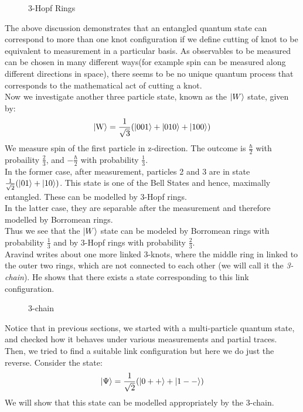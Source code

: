 \documentclass{scrartcl}
\begin{document}
\begin{figure}[H]
    \centering
   \scalebox{0.8}{ }
   \caption{3-Hopf Rings}
\end{figure}
\noindent
The above discussion demonstrates that an entangled quantum state can correspond to more than one knot configuration if we define cutting of knot to be equivalent to measurement in a particular basis. As observables to be measured can be chosen in many different ways(for example spin can be measured along different directions in space), there seems to be no unique quantum process that corresponds to the mathematical act of cutting a knot. \\[0.3cm]
Now we investigate another three particle state, known as the $\ket{W}$ state, given by:
\[
\ket{\mathrm{W}} = \frac{1}{\sqrt{3}} (\ket{001}+\ket{010}+\ket{100}) 
\]
We measure spin of the first particle in z-direction. The outcome is $\frac{\hbar}{2}$ with probaility $\frac{2}{3}$, and $-\frac{\hbar}{2}$ with probability $\frac{1}{3}$.\\[0.2cm]
In the former case, after measurement, particles 2 and 3 are in state $\frac{1}{\sqrt{2}}(\ket{01}+\ket{10})$. This state is one of the Bell States and hence, maximally entangled. These can be modelled by 3-Hopf rings.\\[0.3cm] In the latter case, they are separable after the measurement and therefore modelled by Borromean rings.\\[0.3cm]
Thus we see that the $\ket{W}$ state can be modeled by Borromean rings with probability $\frac{1}{3}$ and by 3-Hopf rings with probability $\frac{2}{3}$.\\[0.3cm]
Aravind writes about one more linked 3-knots, where the middle ring in linked to the outer two rings, which are not connected to each other (we will call it the \textit{3-chain}). He shows that there exists a state corresponding to this link configuration.
\begin{figure}[H]
    \centering
   \scalebox{0.8}{ }
   \caption{3-chain}
\end{figure}
Notice that in previous sections, we started with a multi-particle quantum state, and checked how it behaves under various measurements and partial traces. Then, we tried to find a suitable link configuration but here we do just the reverse. 
Consider the state:
\[
\ket{\Psi} = \frac{1}{\sqrt{2}} (\ket{0++}+\ket{1--})
\]
We will show that this state can be modelled appropriately by the 3-chain.
\end{document}
